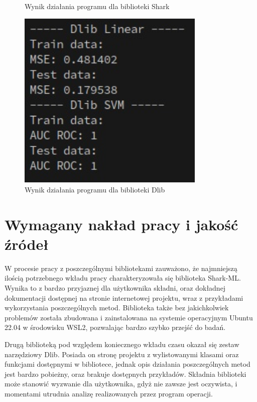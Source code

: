 \begin{figure}[!ht]
\begin{minipage}{0.31\textwidth}
		\caption{Wynik działania programu dla biblioteki Shark}
		\label{fig:shark_linear_svm2}		
	\end{minipage}%
	\hspace{0.02\textwidth}
	\begin{minipage}{0.31\textwidth}
		\centering
		\includegraphics[width=0.8\textwidth]{Rysunki/Rozdzial7/dlib_linear_svm}
		\caption{Wynik działania programu dla biblioteki Dlib}
		\label{fig:dlib_linear_svm2}
	\end{minipage}
\end{figure} 

\section{Wymagany nakład pracy i jakość źródeł}

W procesie pracy z poszczególnymi bibliotekami zauważono, że najmniejszą ilością potrzebnego wkładu pracy charakteryzowała się biblioteka Shark-ML. Wynika to z bardzo przyjaznej dla użytkownika składni, oraz dokładnej dokumentacji dostępnej na stronie internetowej projektu, wraz z przykładami wykorzystania poszczególnych metod. Biblioteka także bez jakichkolwiek problemów została zbudowana i zainstalowana na systemie operacyjnym Ubuntu 22.04 w środowisku WSL2, pozwalając bardzo szybko przejść do badań.

Drugą biblioteką pod względem koniecznego wkładu czasu okazał się zestaw narzędziowy Dlib. Posiada on stronę projektu z wylistowanymi klasami oraz funkcjami dostępnymi w bibliotece, jednak opis działania poszczególnych metod jest bardzo pobieżny, oraz brakuje dostępnych przykładów. Składnia biblioteki może stanowić wyzwanie dla użytkownika, gdyż nie zawsze jest oczywista, i momentami utrudnia analizę realizowanych przez program operacji.

